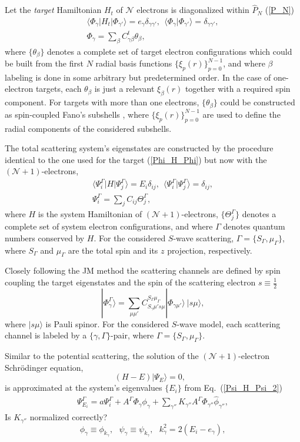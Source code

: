 \documentclass[aip
, pra
, showpacs
, aps
, twocolumn
, groupedaddress
, floatfix
]{revtex4}
\newcommand{\beq}{\begin{equation}}
\newcommand{\eeq}{\end{equation}}
\newcommand{\barr}{\begin{array}}
\newcommand{\earr}{\end{array}}
\begin{document}
Let the {\em target} Hamiltonian $H_t$ of   
$\mathcal{N}$ electrons
is diagonalized within $\hat{P}_N$ (\ref{P_N})
\beq \barr{l}
\langle \Phi_\gamma|H_t|\Phi_{\gamma'}\rangle=e_\gamma \delta_{\gamma\gamma'}, \ \
\langle \Phi_\gamma|\Phi_{\gamma'}\rangle=\delta_{\gamma\gamma'},\\
\Phi_\gamma = \sum_{\beta} C^t_{\gamma \beta} \theta_\beta,
\earr \label{Phi_H_Phi} \eeq
where $\{\theta_\beta\}$ denotes a complete set of target electron configurations which could be built from
the first $N$ radial basis functions $\{\xi_p(r)\}_{p=0}^{N-1}$,
and where $\beta$ labeling is done in some arbitrary but predetermined order.
In the case of one-electron targets, each
$\theta_\beta$ is just a relevant $\xi_\beta(r)$ together with a required spin component.
For targets with more than one electrons, $\{\theta_\beta\}$ could be constructed as spin-coupled Fano's subshells \cite{Fano65,KFB11},
where $\{\xi_p(r)\}_{p=0}^{N-1}$ are used to define the radial components of the considered subshells.


The total scattering system's eigenstates are constructed by the procedure identical to the one used for the target (\ref{Phi_H_Phi}) 
but now with the $(\mathcal{N}+1)$-electrons,
\beq \barr{l}
\langle\Psi_i^\Gamma|H|\Psi_j^\Gamma\rangle=E_i\delta_{ij}, \ \
 \langle\Psi_i^\Gamma|\Psi_j^\Gamma\rangle=\delta_{ij},\\
\Psi^\Gamma_i = \sum_{j} C_{ij} \Theta^\Gamma_j,
\earr \label{Psi_H_Psi_2} \eeq
where $H$ is the system Hamiltonian of $(\mathcal{N}+1)$-electrons, $\{\Theta_j^\Gamma\}$
denotes a complete set of system electron configurations, and where 
$\Gamma$ denotes quantum numbers conserved by $H$.
For the considered $S$-wave scattering,
$\Gamma=\{S_\Gamma,\mu_\Gamma\}$, where $S_\Gamma$ and $\mu_\Gamma$ are the total spin and its $z$ projection, respectively.


Closely following the JM method \cite{BR76p1491, KFB11} the scattering channels are defined by spin coupling the target eigenstates 
and the spin of the scattering electron
$s\equiv \frac{1}{2}$
\beq 
| \Phi_{\gamma}^{\Gamma} \rangle = \sum_{\mu \mu'}
C_{S_\gamma \mu' s \mu}^{S_\Gamma \mu_\Gamma}
|\Phi_{\gamma \mu'} \rangle \ |s \mu  \rangle, 
\label{chi_phi_Gamma} \eeq
where $|s \mu \rangle$ is Pauli spinor.
For the considered $S$-wave model, each scattering channel is labeled by a $\{\gamma, \Gamma\}$-pair, where
$\Gamma=\{S_\Gamma,\mu_\Gamma\}$.




Similar to the potential scattering, the solution of the $(\mathcal{N}+1)$-electron Schr\"odinger equation,
\beq
(H-E) | \Psi_E \rangle =0,  \ \ \  \label{H_E_Psi_E_2}
\eeq
is approximated at the system's eigenvalues $\{E_i\}$ from Eq.~(\ref{Psi_H_Psi_2})
\beq \barr{l}
 \Psi_{E_i}^{\Gamma}  =  a \Psi_i^{\Gamma}
 + A^{\Gamma} \Phi_{\gamma}  \phi_{\gamma}
+ \sum_{\gamma''} K_{\gamma''} A^{\Gamma} \Phi_{\gamma''}   \widehat{\phi}_{\gamma''} ,
\earr \label{Psi_} \eeq
Is $K_{\gamma''}$ normalized correctly?
\beq
\phi_{\gamma}\equiv \phi_{k_\gamma}, \ \ \ \psi_{\gamma}\equiv \psi_{k_\gamma}, \ \ \   k_{\gamma}^2 = 2(E_i - e_\gamma),
\eeq
\end{document}
